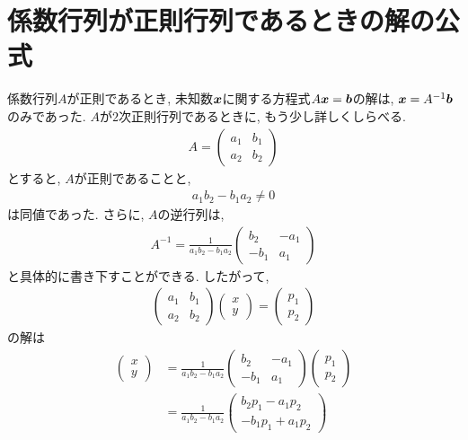 \section{係数行列が正則行列であるときの解の公式}
\label{thm:cramer}
係数行列$A$が正則であるとき,
未知数$\boldsymbol{x}$に関する方程式$A\boldsymbol{x}=\boldsymbol{b}$の解は,
$\boldsymbol{x}=A^{-1}\boldsymbol{b}$のみであった.
$A$が$2$次正則行列であるときに,
もう少し詳しくしらべる.
\begin{align*}
  A=\begin{pmatrix}a_1&b_1\\a_2&b_2\end{pmatrix}
\end{align*}
とすると, $A$が正則であることと,
\begin{align*}
  a_1b_2-b_1a_2\neq 0
\end{align*}
は同値であった.
さらに, $A$の逆行列は,
\begin{align*}
  A^{-1}=\frac{1}{a_1b_2-b_1a_2}\begin{pmatrix}b_2&-a_1\\-b_1&a_1\end{pmatrix}
\end{align*}
と具体的に書き下すことができる.
したがって,
\begin{align*}
  \begin{pmatrix}a_1&b_1\\a_2&b_2\end{pmatrix}
    \begin{pmatrix}x\\y\end{pmatrix}
    =\begin{pmatrix}p_1\\p_2\end{pmatrix}
\end{align*}
の解は
\begin{align*}
  \begin{pmatrix}x\\y\end{pmatrix}
    &=
    \frac{1}{a_1b_2-b_1a_2}\begin{pmatrix}b_2&-a_1\\-b_1&a_1\end{pmatrix}
      \begin{pmatrix}p_1\\p_2\end{pmatrix}
        \\
    &=
    \frac{1}{a_1b_2-b_1a_2}\begin{pmatrix}b_2p_1-a_1p_2\\-b_1p_1+a_1p_2\end{pmatrix}
\end{align*}
